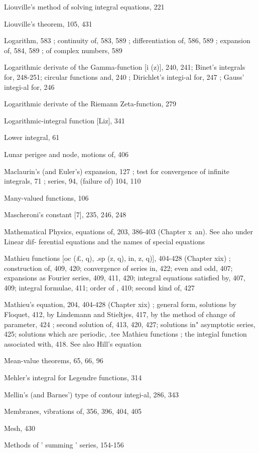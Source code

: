 Liouville's method of solving integral equations, 221

Liouville's theorem, 105, 431

Logarithm, 583 ; continuity of, 583, 589 ; differentiation of, 586, 589 ; expansion of, 584, 589 ;
of complex numbers, 589

Logarithmic derivate of the Gamma-function [i (z)], 240, 241; Binet's integrals for, 248-251;
circular functions and, 240 ; Dirichlet's integi-al for, 247 ; Gauss' integi-al for, 246

Logarithmic derivate of the Riemann Zeta-function, 279

Logarithmic-integral function [Liz], 341

Lower integral, 61

Lunar perigee and node, motions of, 406

Maclaurin's (and Euler's) expansion, 127 ; test for convergence of infinite integrals, 71 ; series,
94, (failure of) 104, 110

Many-valued functions, 106

Mascheroni's constant [7], 235, 246, 248

Mathematical Physics, equations of, 203, 386-403 (Chapter x\ an). See aho under Linear dif-
ferential equations and the names of special equations

Mathieu functions [oc (£, q), .sp (z, q), in,  z, q)], 404-428 (Chapter xix) ; construction of, 409,
420; convergence of series in, 422; even and odd, 407; expansions as Fourier series, 409,
411, 420; integral equations satisfied by, 407, 409; integral formulae, 411; order of , 410;
second kind of, 427

Mathieu's equation, 204, 404-428 (Chapter xix) ; general form, solutions by Floquet, 412, by
Lindemann and Stieltjes, 417, by the method of change of parameter, 424 ; second solution
of, 413, 420, 427; solutions in" asymptotic series, 425; solutions which are periodic, .tee
Mathieu functions ; the integial function associated with, 418. See also Hill's equation

Mean-value theorems, 65, 66, 96

Mehler's integral for Legendre functions, 314

Mellin's (and Barnes') type of contour integi-al, 286, 343

Membranes, vibrations of, 356, 396, 404, 405

Mesh, 430

Methods of ' summing ' series, 154-156

